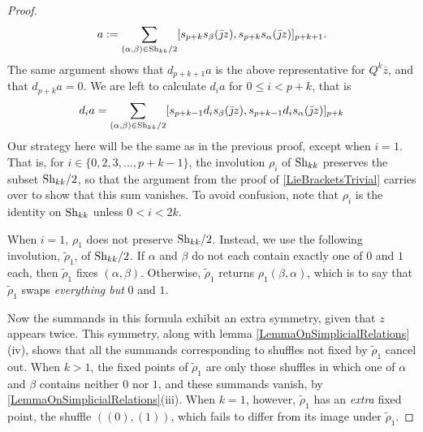 \documentclass[10pt]{article}
\newcommand{\jmathbar}{\bar{\jmath}}
\renewcommand{\Q}{Q}
\newcommand{\Shuffles}[2]{\textup{Sh}_{#1#2}}
\newcommand{\HalfShuffles}[2]{\textup{Sh}_{#1#2}/2}
\begin{document}
\begin{LieLambdaStructureOnKoszul}
\begin{proof}
\[a:=\sum_{(\alpha,\beta)\in\HalfShuffles{k}{k}}[s_{p+k}s_\beta(\jmathbar z), s_{p+k}s_\alpha(\jmathbar z)]_{p+k+1}.\]
The same argument shows that $d_{p+k+1}a$ is the above representative for $\Q^k\overline{z}$, and that $d_{p+k}a=0$. We are left to calculate $d_ia$ for $0\leq i<p+k$, that is
\[d_ia=\sum_{(\alpha,\beta)\in\HalfShuffles{k}{k}}[s_{p+k-1}d_is_\beta(\jmathbar z), s_{p+k-1}d_is_\alpha(\jmathbar z)]_{p+k}\]
Our strategy here will be the same as in the previous proof, except when $i=1$. That is, for $i\in\{0,2,3,\ldots,p+k-1\}$, the involution $\rho_i$ of $\Shuffles{k}{k}$ preserves the subset $\HalfShuffles{k}{k}$, so that the argument from the proof of \ref{LieBracketsTrivial} carries over to show that this sum vanishes. To avoid confusion, note that $\rho_i$ is the identity on $\Shuffles{k}{k}$ unless $0<i<2k$.

When $i=1$, $\rho_1$ does not preserve $\HalfShuffles{k}{k}$. Instead, we use the following involution, $\widetilde{\rho}_1$, of $\HalfShuffles{k}{k}$. If $\alpha$ and $\beta$ do not each contain exactly one of $0$ and $1$ each, then $\widetilde{\rho}_1$ fixes $(\alpha,\beta)$. Otherwise, $\widetilde{\rho}_1$ returns $\rho_1(\beta,\alpha)$, which is to say that $\widetilde{\rho}_1$ swaps \emph{everything but} $0$ and $1$.

Now the summands in this formula exhibit an extra symmetry, given that $z$ appears twice. This symmetry, along with lemma \ref{LemmaOnSimplicialRelations}(iv), shows that all the summands corresponding to shuffles not fixed by $\widetilde{\rho}_1$ cancel out. When $k>1$, the fixed points of $\widetilde{\rho}_1$ are only those shuffles in which one of $\alpha$ and $\beta$ contains neither $0$ nor $1$, and these summands vanish, by \ref{LemmaOnSimplicialRelations}(iii). When $k=1$, however, $\widetilde{\rho}_1$ has an \emph{extra} fixed point, the shuffle $((0),(1))$, which fails to differ from its image under $\widetilde{\rho}_1$.


\end{proof}
\end{LieLambdaStructureOnKoszul}
\end{document}

